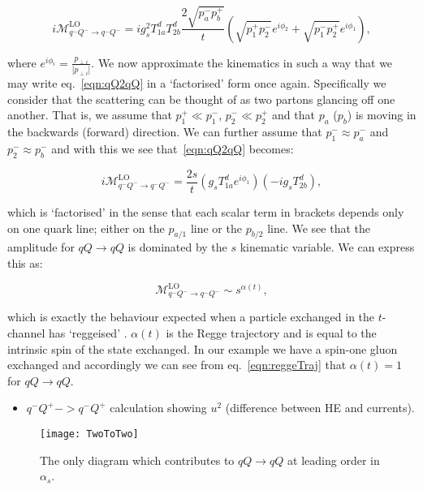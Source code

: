 		\begin{equation}
			i\mathcal{M}_{q^-Q^-\rightarrow q^-Q^-}^{\text{LO}} = ig_s^2T^d_{1a}T^d_{2b}\frac{2\sqrt{p_a^-p_b^+}}{t}
			\left(\sqrt{p_1^+p_2^-}e^{i\phi_2} + \sqrt{p_1^-p_2^+}e^{i\phi_1}\right),
			\label{eqn:qQ2qQ}
		\end{equation}

		where $e^{i\phi_i} = \frac{p_{\perp i}}{|p_{\perp i}|}$.  We now approximate the kinematics in such a way that we may write
		eq.~\eqref{eqn:qQ2qQ} in a `factorised' form once again.  Specifically we consider that the scattering can be thought
		of as two partons glancing off one another.  That is, we assume that $p_1^+\ll p_1^-$, $p_2^-\ll p_2^+$ and that $p_a$ ($p_b$)
		is moving in the backwards (forward) direction.  We can further assume that $p_1^-\approx p_a^-$ and $p_2^-\approx p_b^-$
		and with this we see that~\eqref{eqn:qQ2qQ} becomes:

		\begin{equation}
			i\mathcal{M}_{q^-Q^-\rightarrow q^-Q^-}^{\text{LO}} = \frac{2s}{t}\left(g_sT^d_{1a}e^{i\phi_1}\right)\left(-ig_sT^d_{2b}\right),
			\label{eqn:reggeTraj}
		\end{equation}

		which is `factorised' in the sense that each scalar term in brackets depends only on one quark line; either on the $p_{a/1}$
		line or the $p_{b/2}$ line.  We see that the amplitude for $qQ\rightarrow qQ$ is dominated by the $s$ kinematic variable.
		We can express this as:

		\begin{equation}
			\mathcal{M}_{q^-Q^-\rightarrow q^-Q^-}^{\text{LO}} \sim s^{\alpha(t)},
		\end{equation}

		which is exactly the behaviour expected when a particle exchanged in the $t$-channel has `reggeised'
		\cite{sabioThesis,DelDuca:1995hf,lipatovBook}.  $\alpha(t)$ is the Regge trajectory and is equal to
		the intrinsic spin of the state exchanged.  In our example we have a spin-one gluon exchanged
		and accordingly we can see from eq.~\eqref{eqn:reggeTraj} that $\alpha(t)=1$ for $qQ\rightarrow qQ$.

		{\color{red}
		\begin{itemize}
			\item $q^-Q^+ -> q^-Q^+$ calculation showing $u^2$ (difference between HE and currents).
		\end{itemize}
		}

		\begin{figure}
			\begin{center}
			\texttt{[image: TwoToTwo]}
			\caption{The only diagram which contributes to $qQ\rightarrow qQ$ at leading order in $\alpha_s$.}
			\label{fig:TwoToTwo}
			\end{center}
		\end{figure}

